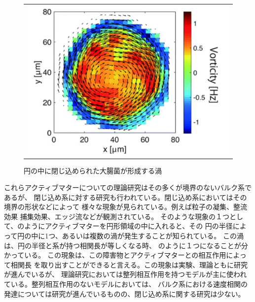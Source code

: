 \documentclass[/Users/ikedahajime/GitHub/reserch/master_report/thesis]{subfiles}
\begin{document}
\begin{figure}
    \centering
    \begin{tabular}{c}
        \begin{minipage}{0.6\hsize}
            \includegraphics[width=\textwidth]{img/intro/circle_ecoil.pdf}
        \end{minipage}
    \end{tabular}
    \caption[Four sample images]
    {
        円の中に閉じ込められた大腸菌が形成する渦\cite{beppuGeometrydrivenCollectiveOrdering2017}
    }
    \label{fig:intro_confine}
\end{figure}


これらアクティブマターについての理論研究はその多くが境界のないバルク系であるが、
閉じ込め系に対する研究も行われている。閉じ込め系においてはその境界の形状などによって
様々な現象が見られている。例えば粒子の凝集\cite{dasAggregateMorphologyActive2020}、整流効果\cite{ghoshSelfPropelledJanusParticles2013}
捕集効果\cite{kaiserHowCaptureActive2012}、エッジ流\cite{soniOddFreeSurface2019}などが観測されている。
そのような現象の１つとして、のようにアクティブマターを円形領域の中に入れると、その
円の半径によって円の中に1つ、あるいは複数の渦が発生することが知られている。
この渦は、円の半径と系が持つ相関長が等しくなる時、
のように１つになることが分かっている。
この現象は、この障害物とアクティブマターとの相互作用によって相関長
を取り出すことができると言える。この現象は実験、理論ともに研究が進んでいるが、
理論研究においては整列相互作用を持つモデルが主に使われている。整列相互作用のないモデルにおいては、
バルク系における速度相関の発達については研究が進んでいる\cite{szamelLongrangedVelocityCorrelations2021,kurodaAnomalousFluctuationsHomogeneous2023,kurodaLongrangeTranslationalOrder2024}ものの、閉じ込め系に関する研究は少ない。
\end{document}
